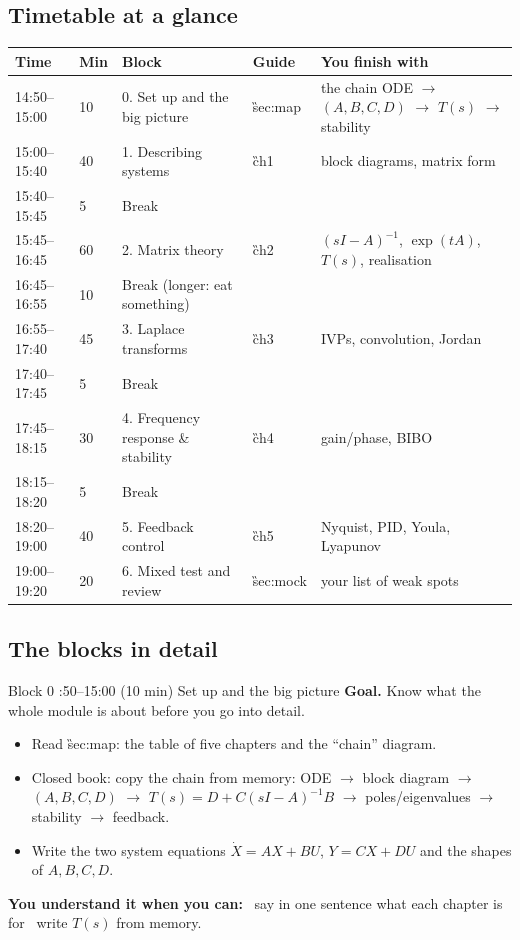 \subsection*{Timetable at a glance}
\begin{center}
\renewcommand{\arraystretch}{1.3}
\small
\begin{tabular}{@{}p{2.1cm}p{0.9cm}p{4.6cm}p{3.4cm}p{3.6cm}@{}}
\toprule
\textbf{Time} & \textbf{Min} & \textbf{Block} & \textbf{Guide} & \textbf{You finish with}\\\midrule
14:50--15:00 & 10 & 0. Set up and the big picture & \G{sec:map} & the chain ODE $\to$ $(A,B,C,D)$ $\to$ $T(s)$ $\to$ stability \\
15:00--15:40 & 40 & 1. Describing systems & \G{ch1} & block diagrams, matrix form\\
15:40--15:45 & 5 & Break & & \\
15:45--16:45 & 60 & 2. Matrix theory & \G{ch2} & $(sI-A)^{-1}$, $\exp(tA)$, $T(s)$, realisation\\
16:45--16:55 & 10 & Break (longer: eat something) & & \\
16:55--17:40 & 45 & 3. Laplace transforms & \G{ch3} & IVPs, convolution, Jordan\\
17:40--17:45 & 5 & Break & & \\
17:45--18:15 & 30 & 4. Frequency response \& stability & \G{ch4} & gain/phase, BIBO\\
18:15--18:20 & 5 & Break & & \\
18:20--19:00 & 40 & 5. Feedback control & \G{ch5} & Nyquist, PID, Youla, Lyapunov\\
19:00--19:20 & 20 & 6. Mixed test and review & \G{sec:mock} & your list of weak spots\\
\bottomrule
\end{tabular}
\end{center}

\subsection*{The blocks in detail}

\begin{sessionbox}{Block 0 :50--15:00 (10 min) \quad Set up and the big picture}
\textbf{Goal.} Know what the whole module is about before you go into detail.
\begin{itemize}
\item[\core] Read \G{sec:map}: the table of five chapters and the ``chain'' diagram.
\item[\core] Closed book: copy the chain from memory: ODE $\to$ block diagram $\to$ $(A,B,C,D)$ $\to$ $T(s)=D+C(sI-A)^{-1}B$ $\to$ poles/eigenvalues $\to$ stability $\to$ feedback.
\item[\core] Write the two system equations $\dot X=AX+BU$, $Y=CX+DU$ and the shapes of $A,B,C,D$.
\end{itemize}
\textbf{You understand it when you can:} \tick\ say in one sentence what each chapter is for \quad \tick\ write $T(s)$ from memory.
\end{sessionbox}

